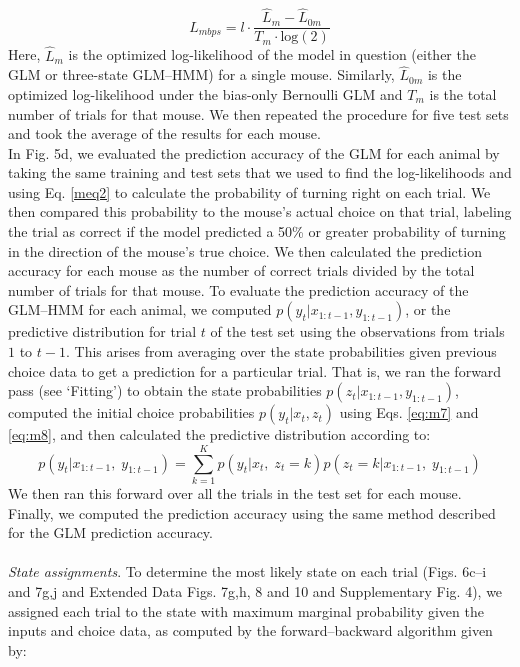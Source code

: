 \begin{equation}
\label{eq:m17}
L_{mbps} = l \cdot \frac{{\hat L_m - \hat L_{0m}}}{{T_m \cdot {{{\mathrm{log}}}}(2)}}
\end{equation}
Here, $\hat L_m$ is the optimized log-likelihood of the model in question (either the GLM or three-state GLM–HMM) for a single mouse. Similarly, $\hat L_{0m}$ is the optimized log-likelihood under the bias-only Bernoulli GLM and $T_m$ is the total number of trials for that mouse. We then repeated the procedure for five test sets and took the average of the results for each mouse. \\
In Fig. 5d, we evaluated the prediction accuracy of the GLM for each animal by taking the same training and test sets that we used to find the log-likelihoods and using Eq. \ref{meq2} to calculate the probability of turning right on each trial. We then compared this probability to the mouse’s actual choice on that trial, labeling the trial as correct if the model predicted a 50\% or greater probability of turning in the direction of the mouse’s true choice. We then calculated the prediction accuracy for each mouse as the number of correct trials divided by the total number of trials for that mouse. To evaluate the prediction accuracy of the GLM–HMM for each animal, we computed $p(y_t|x_{1:t - 1},y_{1:t - 1})$, or the predictive distribution for trial $t$ of the test set using the observations from trials $1$ to $t - 1$. This arises from averaging over the state probabilities given previous choice data to get a prediction for a particular trial. That is, we ran the forward pass (see ‘Fitting’) to obtain the state probabilities $p(z_t|x_{1:t - 1},y_{1:t - 1})$, computed the initial choice probabilities $p(y_t|x_t,z_t)$ using Eqs. \ref{eq:m7} and \ref{eq:m8}, and then calculated the predictive distribution according to:
\begin{equation}
\label{eq:m18}
p\left( {y_t|x_{1:t - 1},\;y_{1:t - 1}} \right) = \mathop {\sum }\limits_{k = 1}^K p\left( {y_t|x_t,\;z_t = k} \right)p\left( {z_t = k|x_{1:t - 1},\;y_{1:t - 1}} \right)
\end{equation}
We then ran this forward over all the trials in the test set for each mouse. Finally, we computed the prediction accuracy using the same method described for the GLM prediction accuracy. \\\\
\textit{State assignments}. To determine the most likely state on each trial (Figs. 6c–i and 7g,j and Extended Data Figs. 7g,h, 8 and 10 and Supplementary Fig. 4), we assigned each trial to the state with maximum marginal probability given the inputs and choice data, as computed by the forward–backward algorithm given by:
